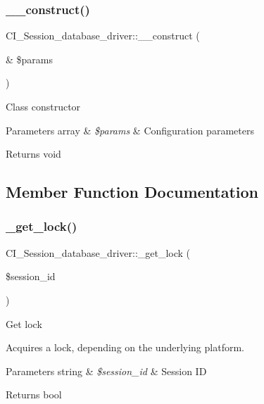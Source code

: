 \subsubsection{\texorpdfstring{\+\_\+\+\_\+construct()}{\_\_construct()}}
{\footnotesize\ttfamily C\+I\+\_\+\+Session\+\_\+database\+\_\+driver\+::\+\_\+\+\_\+construct (\begin{DoxyParamCaption}\item[{\&}]{\$params }\end{DoxyParamCaption})}

Class constructor


\begin{DoxyParams}[1]{Parameters}
array & {\em \$params} & Configuration parameters \\
\hline
\end{DoxyParams}
\begin{DoxyReturn}{Returns}
void 
\end{DoxyReturn}


\subsection{Member Function Documentation}
\mbox{\label{class_c_i___session__database__driver_a89d94d77a9dc0e3b29dbbc0f7938d215}} 
\subsubsection{\texorpdfstring{\+\_\+get\+\_\+lock()}{\_get\_lock()}}
{\footnotesize\ttfamily C\+I\+\_\+\+Session\+\_\+database\+\_\+driver\+::\+\_\+get\+\_\+lock (\begin{DoxyParamCaption}\item[{}]{\$session\+\_\+id }\end{DoxyParamCaption})\hspace{0.3cm}{\ttfamily [protected]}}

Get lock

Acquires a lock, depending on the underlying platform.


\begin{DoxyParams}[1]{Parameters}
string & {\em \$session\+\_\+id} & Session ID \\
\hline
\end{DoxyParams}
\begin{DoxyReturn}{Returns}
bool 
\end{DoxyReturn}
\mbox{\label{class_c_i___session__database__driver_ad6f6bc60a6fbfd6aecba9c7bde898a39}} 
